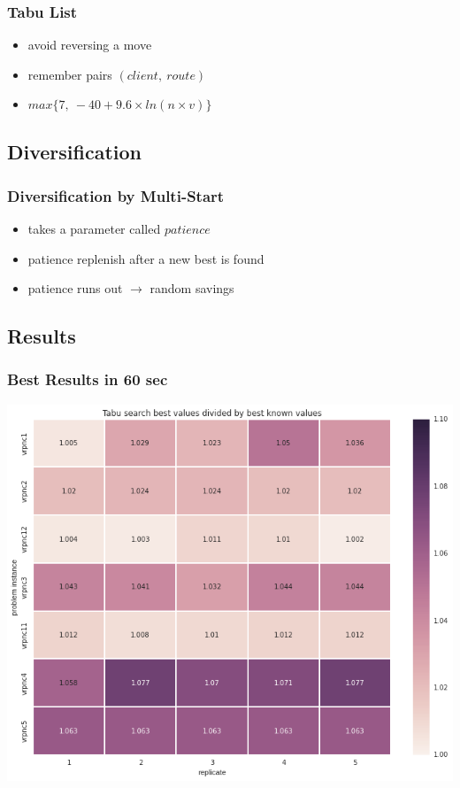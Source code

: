 \documentclass{beamer}
\begin{document}
\begin{frame}
\frametitle{Tabu List}
\begin{itemize}
	\item avoid reversing a move
	\item remember pairs $(client,\ route)$
	\item $max\{7,\ -40 + 9.6 \times ln(n \times v)\}$
\end{itemize}
\end{frame}


\subsection{Diversification}

\begin{frame}
\frametitle{Diversification by Multi-Start}
\begin{itemize}
	\item takes a parameter called $patience$
	\item patience replenish after a new best is found
	\item patience runs out $\rightarrow$ random savings
\end{itemize}
\end{frame}

\subsection{Results}

\begin{frame}
\frametitle{Best Results in 60 sec}
\begin{center}
\includegraphics[scale=0.25]{figs/tabu_search}

\end{center}
\end{frame}
\end{document}
